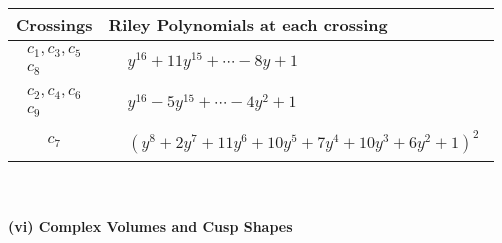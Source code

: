 \documentclass[1p]{elsarticle_modified}
\theoremstyle{definition}
\begin{document}
\begin{tabular}{m{50pt}|m{274pt}}
Crossings & \hspace{64pt}Riley Polynomials at each crossing \\
\hline $$\begin{aligned}c_{1},c_{3},c_{5}\\c_{8}\end{aligned}$$&$\begin{aligned}
&y^{16}+11 y^{15}+\cdots-8 y+1
\end{aligned}$\\
\hline $$\begin{aligned}c_{2},c_{4},c_{6}\\c_{9}\end{aligned}$$&$\begin{aligned}
&y^{16}-5 y^{15}+\cdots-4 y^2+1
\end{aligned}$\\
\hline $$\begin{aligned}c_{7}\end{aligned}$$&$\begin{aligned}
&(y^8+2 y^7+11 y^6+10 y^5+7 y^4+10 y^3+6 y^2+1)^2
\end{aligned}$\\
\hline
\end{tabular}\\~\\
\newpage\flushleft \textbf{(vi) Complex Volumes and Cusp Shapes}
\end{document}
